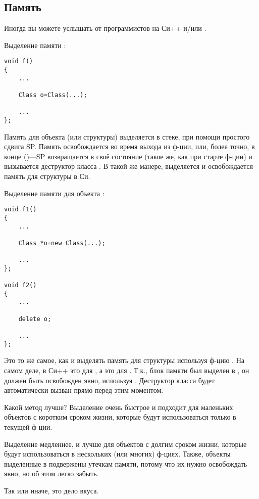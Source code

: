 \subsection{Память}

Иногда вы можете услышать от программистов на Си++  и/или .

Выделение памяти :

\begin{lstlisting}[style=customc]
void f()
{
	...

	Class o=Class(...);

	...
};
\end{lstlisting}

Память для объекта (или структуры) выделяется в стеке, при помощи простого сдвига \ac{SP}.
Память освобождается во время выхода из ф-ции, или, более точно, в конце  ()---\ac{SP}
возвращается в своё состояние (такое же, как при старте ф-ции) и вызывается деструктор класса .
В такой же манере, выделяется и освобождается память для структуры в Си.

Выделение памяти для объекта :

\begin{lstlisting}[style=customc]
void f1()
{
	...

	Class *o=new Class(...);

	...
};

void f2()
{
	...

	delete o;

	...
};
\end{lstlisting}

Это то же самое, как и выделять память для структуры используя ф-цию .
На самом деле,  в Си++ это  для , а  это  для .
Т.к., блок памяти был выделен в , он должен быть освобожден явно, используя .
Деструктор класса будет автоматически вызван прямо перед этим моментом.

Какой метод лучше?
Выделение  очень быстрое и подходит для маленьких объектов с коротким сроком жизни, которые будут использоваться
только в текущей ф-ции.

Выделение  медленнее, и лучше для объектов с долгим сроком жизни, которые будут использоваться в нескольких
(или многих) ф-циях.
Также, объекты выделенные в  подвержены утечкам памяти, потому что их нужно освобождать явно, но об этом
легко забыть.

Так или иначе, это дело вкуса.
